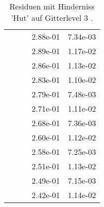 \begin{table}
\begin{tabular}{c|cc|cc|}
\multicolumn{1}{|c|}{} & \multicolumn{1}{|c|}{} & \multicolumn{1}{|c|}{} & \multicolumn{1}{|c|}{  2.88e-01} & \multicolumn{1}{|c|}{  7.34e-03} \\ 
\multicolumn{1}{|c|}{} & \multicolumn{1}{|c|}{} & \multicolumn{1}{|c|}{} & \multicolumn{1}{|c|}{  2.89e-01} & \multicolumn{1}{|c|}{  1.17e-02} \\ 
\multicolumn{1}{|c|}{} & \multicolumn{1}{|c|}{} & \multicolumn{1}{|c|}{} & \multicolumn{1}{|c|}{  2.86e-01} & \multicolumn{1}{|c|}{  1.13e-02} \\ 
\multicolumn{1}{|c|}{} & \multicolumn{1}{|c|}{} & \multicolumn{1}{|c|}{} & \multicolumn{1}{|c|}{  2.83e-01} & \multicolumn{1}{|c|}{  1.10e-02} \\ 
\multicolumn{1}{|c|}{} & \multicolumn{1}{|c|}{} & \multicolumn{1}{|c|}{} & \multicolumn{1}{|c|}{  2.79e-01} & \multicolumn{1}{|c|}{  7.48e-03} \\ 
\multicolumn{1}{|c|}{} & \multicolumn{1}{|c|}{} & \multicolumn{1}{|c|}{} & \multicolumn{1}{|c|}{  2.71e-01} & \multicolumn{1}{|c|}{  1.11e-02} \\ 
\multicolumn{1}{|c|}{} & \multicolumn{1}{|c|}{} & \multicolumn{1}{|c|}{} & \multicolumn{1}{|c|}{  2.68e-01} & \multicolumn{1}{|c|}{  7.36e-03} \\ 
\multicolumn{1}{|c|}{} & \multicolumn{1}{|c|}{} & \multicolumn{1}{|c|}{} & \multicolumn{1}{|c|}{  2.60e-01} & \multicolumn{1}{|c|}{  1.12e-02} \\ 
\multicolumn{1}{|c|}{} & \multicolumn{1}{|c|}{} & \multicolumn{1}{|c|}{} & \multicolumn{1}{|c|}{  2.58e-01} & \multicolumn{1}{|c|}{  7.25e-03} \\ 
\multicolumn{1}{|c|}{} & \multicolumn{1}{|c|}{} & \multicolumn{1}{|c|}{} & \multicolumn{1}{|c|}{  2.51e-01} & \multicolumn{1}{|c|}{  1.13e-02} \\ 
\multicolumn{1}{|c|}{} & \multicolumn{1}{|c|}{} & \multicolumn{1}{|c|}{} & \multicolumn{1}{|c|}{  2.49e-01} & \multicolumn{1}{|c|}{  7.15e-03} \\ 
\multicolumn{1}{|c|}{} & \multicolumn{1}{|c|}{} & \multicolumn{1}{|c|}{} & \multicolumn{1}{|c|}{  2.42e-01} & \multicolumn{1}{|c|}{  1.14e-02} \\ 
\hline 
\end{tabular}\caption{Residuen mit Hinderniss 'Hut' auf Gitterlevel 3 .}\label{tab:Residuum_Hut_level3}
\end{table} 
